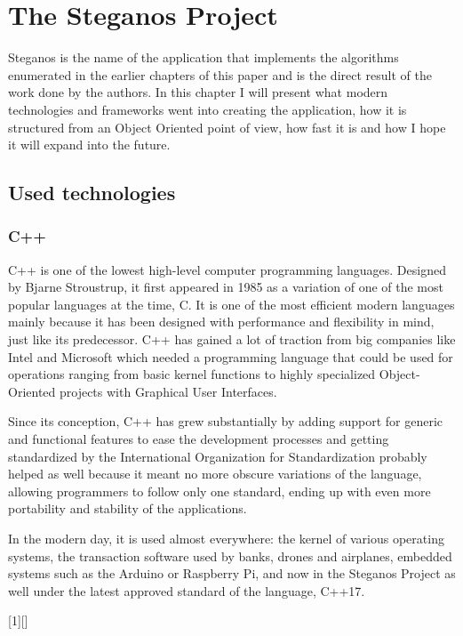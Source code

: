 
\chapter{The Steganos Project}
\begin{multicols*}{2}
Steganos is the name of the application that implements the algorithms enumerated in the earlier chapters of this paper and is the direct result of the work done by the authors. In this chapter I will present what modern technologies and frameworks went into creating the application, how it is structured from an Object Oriented point of view, how fast it is and how I hope it will expand into the future.

\section{Used technologies}
\subsection{C++}
C++ is one of the lowest high-level computer programming languages. Designed by Bjarne Stroustrup, it first appeared in 1985 as a variation of one of the most popular languages at the time, C. It is one of the most efficient modern languages mainly because it has been designed with performance and flexibility in mind, just like its predecessor. C++ has gained a lot of traction  from big companies like Intel and Microsoft which needed a programming language that could be used for operations ranging from basic kernel functions to highly specialized Object-Oriented projects with Graphical User Interfaces\cite{c++-programmming-language}.

Since its conception, C++ has grew substantially by adding support for generic and functional features to ease the development processes and getting standardized by the International Organization for Standardization probably helped as well because it meant no more obscure variations of the language, allowing programmers to follow only one standard, ending up with even more portability and stability of the applications.

In the modern day, it is used almost everywhere: the kernel of various operating systems, the transaction software used by banks, drones and airplanes, embedded systems such as the Arduino or Raspberry Pi, and now in the Steganos Project as well under the latest approved standard of the language, C++17.

[1][] 
   {\lstset{frame=shadowbox,escapechar=`,linewidth=7.5cm, #1}}
   {}


\end{multicols*}

